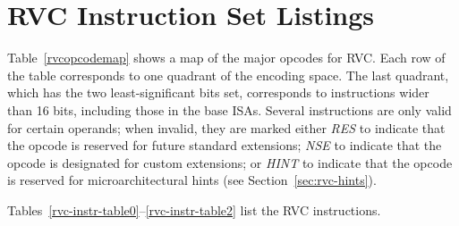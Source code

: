 \clearpage

\section{RVC Instruction Set Listings}

Table~\ref{rvcopcodemap} shows a map of the major opcodes for RVC.
Each row of the table corresponds to one quadrant of the encoding
space.  The last quadrant, which has the two
least-significant bits set, corresponds to instructions wider
than 16 bits, including those in the base ISAs.  Several instructions
are only valid for certain operands; when invalid, they are marked
either {\em RES} to indicate that the opcode is reserved for future
standard extensions; {\em NSE} to indicate that the opcode is designated
for custom extensions; or {\em HINT} to indicate that the opcode
is reserved for microarchitectural hints (see Section~\ref{sec:rvc-hints}).



Tables~\ref{rvc-instr-table0}--\ref{rvc-instr-table2} list the RVC instructions.


